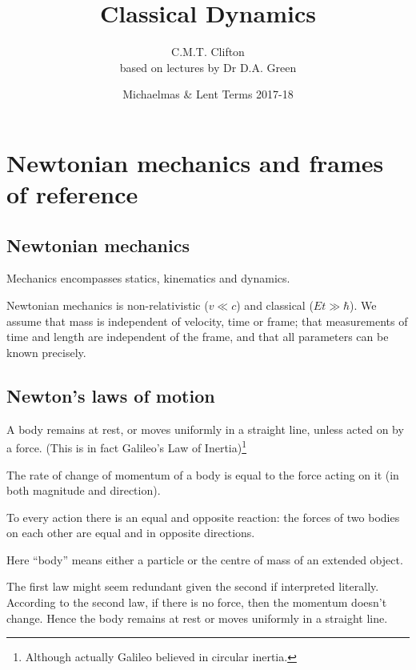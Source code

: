 \documentclass[a4paper]{article}
\title{Classical Dynamics}
\author{C.M.T. Clifton \\ \small based on lectures by Dr D.A. Green}
\date{Michaelmas \& Lent Terms 2017-18}
\begin{document}
\maketitle
\tableofcontents
\newpage
\section{Newtonian mechanics and frames of reference}\label{sec:newtonian-mechanics-and-frames-of-reference}
\subsection{Newtonian mechanics}\label{sec:newtonian-mechanics}
Mechanics encompasses statics, kinematics and dynamics.

Newtonian mechanics is non-relativistic ($v \ll c$) and classical ($E t \gg \hbar$). We assume that mass is independent of velocity, time or frame; that measurements of time and length are independent of the frame, and that all parameters can be known precisely.

\subsection{Newton's laws of motion}\label{sec:newton's-laws-of-motion}
\begin{law}
  A body remains at rest, or moves uniformly in a straight line, unless acted on by a force. (This is in fact Galileo's Law of Inertia)\footnote{Although actually Galileo believed in circular inertia.}
\end{law} 

\begin{law}
   The rate of change of momentum of a body is equal to the force acting on it (in both magnitude and direction). 
\end{law} 

\begin{law}
  To every action there is an equal and opposite reaction: the forces of two bodies on each other are equal and in opposite directions.
\end{law}

Here ``body'' means either a particle or the centre of mass of an extended object.

The first law might seem redundant given the second if interpreted literally. According to the second law, if there is no force, then the momentum doesn't change. Hence the body remains at rest or moves uniformly in a straight line.
\end{document}
